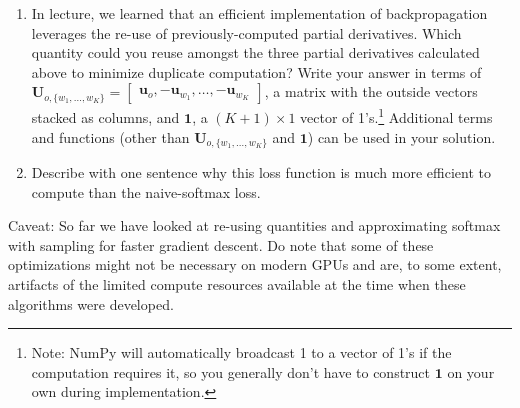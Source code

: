 \documentclass{article}
\begin{document}
\begin{enumerate}[label=(\alph*)]
\begin{enumerate}[label=(\roman*)]
\item In lecture, we learned that an efficient implementation of backpropagation leverages the re-use of previously-computed partial derivatives. Which quantity could you reuse amongst the three partial derivatives calculated above to minimize duplicate computation? Write your answer in terms of \\ $\bm{U}_{o, \{w_1, \dots, w_K\}} = \begin{bmatrix} \bm{u}_o, -\bm{u}_{w_1}, \dots, -\bm{u}_{w_K} \end{bmatrix}$, a matrix with the outside vectors stacked as columns, and $\bm{1}$, a $(K + 1) \times 1$ vector of 1's.\footnote{Note: NumPy will automatically broadcast 1 to a vector of 1's if the computation requires it, so you generally don't have to construct $\bm{1}$ on your own during implementation.}
Additional terms and functions (other than $\bm{U}_{o, \{w_1, \dots, w_K\}}$ and $\bm{1}$) can be used in your solution.
\item Describe with one sentence why this loss function is much more efficient to compute than the naive-softmax loss.
\end{enumerate}

Caveat: So far we have looked at re-using quantities and approximating softmax with sampling for faster gradient descent. Do note that some of these optimizations might not be necessary on modern GPUs and are, to some extent, artifacts of the limited compute resources available at the time when these algorithms were developed.


\end{enumerate}
\end{document}
